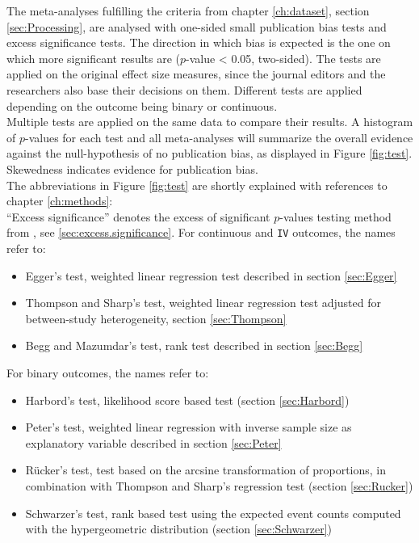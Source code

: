 \documentclass[11pt,a4paper,twoside]{book}\usepackage[]{graphicx}\usepackage[]{color}
\begin{document}
The meta-analyses fulfilling the criteria from chapter \ref{ch:dataset}, section \ref{sec:Processing}, are analysed with one-sided small publication bias tests and excess significance tests. The direction in which bias is expected is the one on which more significant results are ($p$-value < 0.05, two-sided). The tests are applied on the original effect size measures, since the journal editors and the researchers also base their decisions on them. Different tests are applied depending on the outcome being binary or continuous.\\
Multiple tests are applied on the same data to compare their results. A histogram of $p$-values for each test and all meta-analyses will summarize the overall evidence against the null-hypothesis of no publication bias, as displayed in Figure \ref{fig:test}. Skewedness indicates evidence for publication bias.\\
The abbreviations in Figure \ref{fig:test}  are shortly explained with references to chapter \ref{ch:methods}: \\
``Excess significance'' denotes the excess of significant $p$-values testing method from \citet{excess.significance}, see \ref{sec:excess.significance}. For continuous and \texttt{IV} outcomes, the names refer to: 

\begin{itemize}
\item Egger's test, weighted linear regression test described in section \ref{sec:Egger}
\item Thompson and Sharp's test, weighted linear regression test adjusted for between-study heterogeneity, section \ref{sec:Thompson}
\item Begg and Mazumdar's test, rank test described in section \ref{sec:Begg}
\end{itemize}

For binary outcomes, the names refer to:
\begin{itemize}
\item Harbord's test, likelihood score based test (section \ref{sec:Harbord})
\item Peter's test, weighted linear regression with inverse sample size as explanatory variable described in section \ref{sec:Peter}
\item R\"ucker's test, test based on the arcsine transformation of proportions, in combination with Thompson and Sharp's regression test (section \ref{sec:Rucker})
\item Schwarzer's test, rank based test using the expected event counts computed with the hypergeometric distribution (section \ref{sec:Schwarzer})
\end{itemize}
\end{document}
